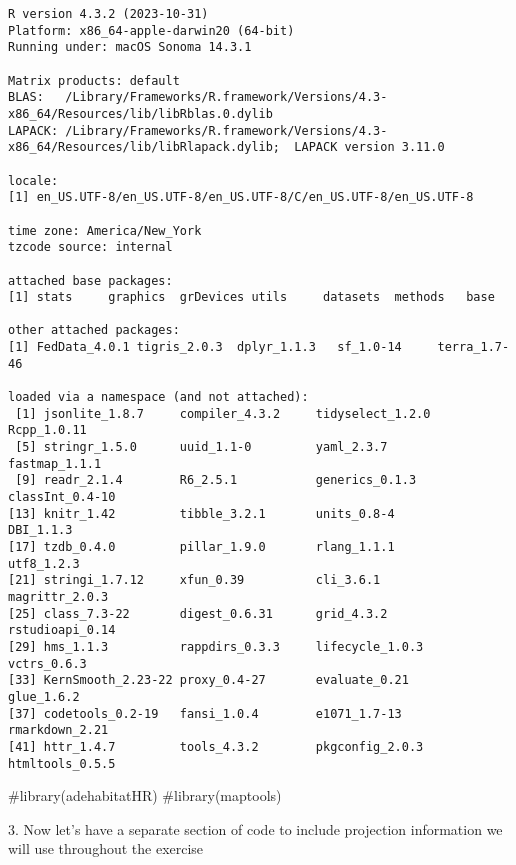\documentclass[
  letterpaper,
]{book}
\newenvironment{Shaded}{\begin{snugshade}}{\end{snugshade}}
\newcommand{\CommentTok}[1]{\textcolor[rgb]{0.37,0.37,0.37}{#1}}
\begin{document}
\begin{verbatim}
R version 4.3.2 (2023-10-31)
Platform: x86_64-apple-darwin20 (64-bit)
Running under: macOS Sonoma 14.3.1

Matrix products: default
BLAS:   /Library/Frameworks/R.framework/Versions/4.3-x86_64/Resources/lib/libRblas.0.dylib 
LAPACK: /Library/Frameworks/R.framework/Versions/4.3-x86_64/Resources/lib/libRlapack.dylib;  LAPACK version 3.11.0

locale:
[1] en_US.UTF-8/en_US.UTF-8/en_US.UTF-8/C/en_US.UTF-8/en_US.UTF-8

time zone: America/New_York
tzcode source: internal

attached base packages:
[1] stats     graphics  grDevices utils     datasets  methods   base     

other attached packages:
[1] FedData_4.0.1 tigris_2.0.3  dplyr_1.1.3   sf_1.0-14     terra_1.7-46 

loaded via a namespace (and not attached):
 [1] jsonlite_1.8.7     compiler_4.3.2     tidyselect_1.2.0   Rcpp_1.0.11       
 [5] stringr_1.5.0      uuid_1.1-0         yaml_2.3.7         fastmap_1.1.1     
 [9] readr_2.1.4        R6_2.5.1           generics_0.1.3     classInt_0.4-10   
[13] knitr_1.42         tibble_3.2.1       units_0.8-4        DBI_1.1.3         
[17] tzdb_0.4.0         pillar_1.9.0       rlang_1.1.1        utf8_1.2.3        
[21] stringi_1.7.12     xfun_0.39          cli_3.6.1          magrittr_2.0.3    
[25] class_7.3-22       digest_0.6.31      grid_4.3.2         rstudioapi_0.14   
[29] hms_1.1.3          rappdirs_0.3.3     lifecycle_1.0.3    vctrs_0.6.3       
[33] KernSmooth_2.23-22 proxy_0.4-27       evaluate_0.21      glue_1.6.2        
[37] codetools_0.2-19   fansi_1.0.4        e1071_1.7-13       rmarkdown_2.21    
[41] httr_1.4.7         tools_4.3.2        pkgconfig_2.0.3    htmltools_0.5.5   
\end{verbatim}

\begin{Shaded}
\begin{Highlighting}[]
\CommentTok{\#library(adehabitatHR)}
\CommentTok{\#library(maptools)}
\end{Highlighting}
\end{Shaded}

3. Now let's have a separate section of code to include projection
information we will use throughout the exercise
\end{document}
